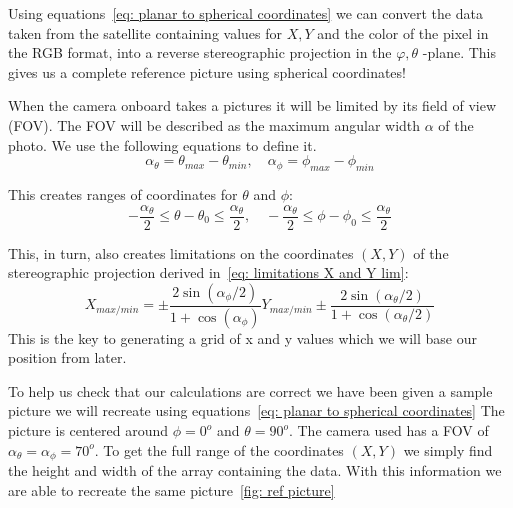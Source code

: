 \documentclass[reprint,english,notitlepage]{revtex4-2}
\begin{document}
Using equations~\ref{eq: planar to spherical coordinates} we can convert the data taken from the satellite containing values for $ X,Y  $ and the color of the pixel in the RGB format, into a reverse stereographic projection in the $ \varphi, \theta $ -plane.
This gives us a complete reference picture using spherical coordinates!

When the camera onboard takes a pictures it will be limited by its field of view (FOV).
The FOV will be described as the maximum angular width $ \alpha $ of the photo.
We use the following equations to define it.
\begin{equation} \label{eq: max angular width}
	α _{\theta} = θ _{max} - \theta _{min}, \quad α _{\phi} = ϕ _{max} - ϕ _{min}
\end{equation}

This creates ranges of coordinates for $\theta$ and $\phi$:
\begin{equation}\label{eq: limitations phi and theta}
  - \frac{\alpha _{\theta}}{2} \le θ - θ _{0} \le \frac{\alpha _{\theta }}{2}, \quad - \frac{\alpha _{\theta}}{2} \le ϕ  - ϕ _{0} \le \frac{\alpha _{\theta }}{2}
\end{equation}

This, in turn, also creates limitations on the coordinates $ (X,Y) $ of the stereographic projection derived in~\ref{eq: limitations X and Y lim}:
\begin{subequations} \label{eq: limitations X and Y lim}
	\begin{equation}
		X _{max / min} = ± \frac{2 \sin (α _{\phi} / 2)}{1 + \cos (\alpha _{\phi})}
	  \end{equation}
	  
	  
	\begin{equation}
		Y _{max / min} ± \frac{2 \sin (\alpha _{\theta}  / 2)}{1 + \cos (α _{\theta}/2)}
	\end{equation}
	
\end{subequations}
This is the key to generating a grid of x and y values which we will base our position from later. 

To help us check that our calculations are correct we have been given a sample picture we will recreate using equations~\ref{eq: planar to spherical coordinates}
The picture is centered around $ \phi = 0^{o} $ and $ \theta = 90^{o} $.
The camera used has a FOV of $ \alpha_{\theta} = \alpha_{\phi} = 70^{o} $.
To get the full range of the coordinates $ (X,Y) $ we simply find the height and width of the array containing the data.
With this information we are able to recreate the same picture~\ref{fig: ref picture}
\end{document}

